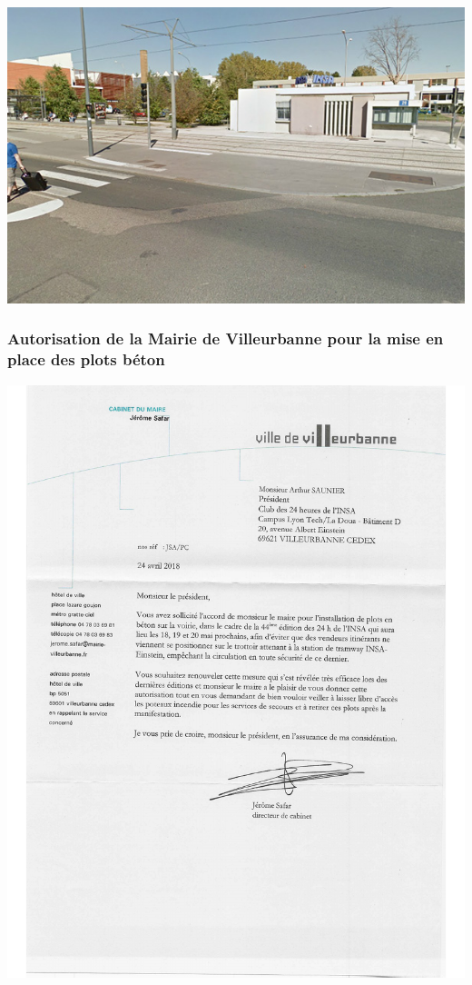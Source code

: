 \documentclass[hidelinks, paper=a4, fontsize=13pt]{report}
\begin{document}
\begin{center}
	\includegraphics[scale=0.7]{Annexes/Images/zoneARisque4}
\end{center}
\subsubsection{Autorisation de la Mairie de Villeurbanne pour la mise en place des plots béton}
\begin{center}
	\includegraphics[page=1,scale=0.7]{Annexes/Documents/AutorisationMunicipalePlotsBeton}
	\label{refVentGS}
\end{center}
\end{document}
